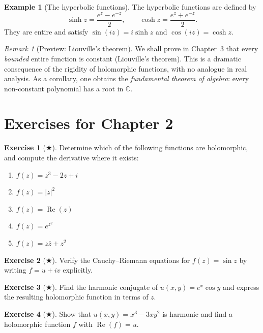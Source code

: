 \documentclass[12pt,a4paper,openany]{book}
\theoremstyle{definition}
\newtheorem{example}[definition]{Example}
\newtheorem{exercise}{Exercise}[chapter]
\theoremstyle{plain}
\theoremstyle{remark}
\newtheorem{remark}[definition]{Remark}
\newcommand{\C}{\mathbb{C}}
\DeclareMathOperator{\re}{Re}
\newcommand{\abs}[1]{\left|#1\right|}
\newcommand{\conj}[1]{\overline{#1}}
\begin{document}
\begin{example}[The hyperbolic functions]
\label{ex:hyperbolic}
The hyperbolic functions are defined by
\[
  \sinh z = \frac{e^z-e^{-z}}{2}, \qquad \cosh z = \frac{e^z+e^{-z}}{2}.
\]
They are entire and satisfy $\sin(iz)=i\sinh z$ and $\cos(iz)=\cosh z$.
\end{example}

\begin{remark}[Preview: Liouville's theorem]
\label{rem:liouville-preview}
We shall prove in Chapter~3 that every \emph{bounded} entire function is constant (Liouville's theorem). This is a dramatic consequence of the rigidity of holomorphic functions, with no analogue in real analysis. As a corollary, one obtains the \emph{fundamental theorem of algebra}: every non-constant polynomial has a root in $\C$.
\end{remark}

\section{Exercises for Chapter 2}
\label{sec:exercises-ch2}

\begin{exercise}[$\bigstar$]
\label{exo:ch2-1}
Determine which of the following functions are holomorphic, and compute the derivative where it exists:
\begin{enumerate}[label=\textup{(\alph*)}]
  \item $f(z) = z^3-2z+i$
  \item $f(z) = \abs{z}^2$
  \item $f(z) = \re(z)$
  \item $f(z) = e^{z^2}$
  \item $f(z) = z\conj{z}+z^2$
\end{enumerate}
\end{exercise}

\begin{exercise}[$\bigstar$]
\label{exo:ch2-2}
Verify the Cauchy--Riemann equations for $f(z) = \sin z$ by writing $f = u+iv$ explicitly.
\end{exercise}

\begin{exercise}[$\bigstar$]
\label{exo:ch2-3}
Find the harmonic conjugate of $u(x,y) = e^x\cos y$ and express the resulting holomorphic function in terms of $z$.
\end{exercise}

\begin{exercise}[$\bigstar$]
\label{exo:ch2-4}
Show that $u(x,y) = x^3-3xy^2$ is harmonic and find a holomorphic function $f$ with $\re(f)=u$.
\end{exercise}
\end{document}
